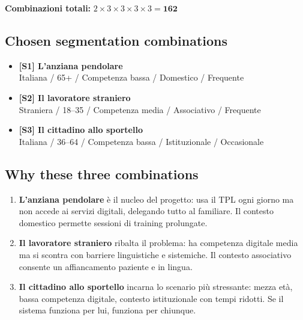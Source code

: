 \documentclass[11pt,a4paper]{article}
\begin{document}
\vspace{0.2cm}
\begin{flushleft}
\textbf{Combinazioni totali:}
\quad $2 \times 3 \times 3 \times 3 \times 3 = \mathbf{162}$
\end{flushleft}
\vspace{0.2cm}

\subsection{Chosen segmentation combinations}

\begin{tcolorbox}[colback=backgroundColor,colframe=borderColor,arc=2mm]
\begin{itemize}[leftmargin=*,itemsep=6pt]
    \item {}\label{seg:anziana}
    \textbf{[S1] L'anziana pendolare}\\
    Italiana / 65+ / Competenza bassa / Domestico / Frequente
    \item {}\label{seg:straniero}
    \textbf{[S2] Il lavoratore straniero}\\
    Straniera / 18--35 / Competenza media / Associativo / Frequente
    \item {}\label{seg:cittadino}
    \textbf{[S3] Il cittadino allo sportello}\\
    Italiana / 36--64 / Competenza bassa / Istituzionale / Occasionale
\end{itemize}
\end{tcolorbox}

\vspace{0.4cm}

\subsection{Why these three combinations}

\begin{enumerate}[leftmargin=*]
    \item \textbf{L'anziana pendolare} è il nucleo del progetto:
    usa il TPL ogni giorno ma non accede ai servizi digitali, delegando
    tutto al familiare. Il contesto domestico permette sessioni di
    training prolungate.
    \item \textbf{Il lavoratore straniero} ribalta il problema:
    ha competenza digitale media ma si scontra con barriere linguistiche
    e sistemiche. Il contesto associativo consente un affiancamento
    paziente e in lingua.
    \item \textbf{Il cittadino allo sportello} incarna lo scenario
    più stressante: mezza età, bassa competenza digitale, contesto
    istituzionale con tempi ridotti. Se il sistema funziona per lui,
    funziona per chiunque.
\end{enumerate}
\end{document}
